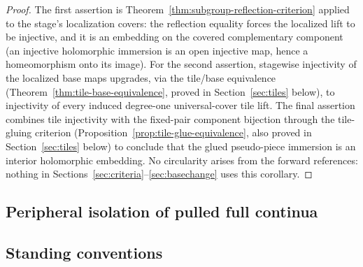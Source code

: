 \documentclass[11pt,reqno]{amsart}
\theoremstyle{definition}
\theoremstyle{remark}
\begin{document}
\begin{proof}
The first assertion is Theorem~\ref{thm:subgroup-reflection-criterion}
applied to the stage's localization covers: the reflection equality
forces the localized lift to be injective, and it is an embedding on
the covered complementary component (an injective holomorphic
immersion is an open injective map, hence a homeomorphism onto its
image).  For the second assertion, stagewise injectivity of the
localized base maps upgrades, via the tile/base equivalence
(Theorem~\ref{thm:tile-base-equivalence}, proved in
Section~\ref{sec:tiles} below), to injectivity of every
induced degree-one universal-cover tile lift.  The final assertion
combines tile injectivity with the fixed-pair component bijection
through the tile-gluing criterion
(Proposition~\ref{prop:tile-glue-equivalence}, also proved in
Section~\ref{sec:tiles} below) to conclude that the
glued pseudo-piece immersion is an interior holomorphic embedding.
No circularity arises from the forward references: nothing in
Sections~\ref{sec:criteria}--\ref{sec:basechange} uses this corollary.
\end{proof}

\subsection{Peripheral isolation of pulled full continua}


\subsection*{Standing conventions}
\end{document}
